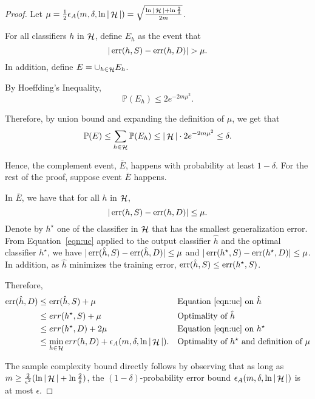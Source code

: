 \documentclass{article}
\DeclareMathOperator*{\err}{{\rm err}}
\DeclareMathOperator*{\Hcal}{{\cal H}}
\newcommand{\PP}{\mathbb{P}}
\begin{document}
\begin{proof}
Let $\mu = \frac{1}{2}\epsilon_A(m,\delta,\ln|\Hcal|) = \sqrt{\frac{\ln|\Hcal| + \ln\frac{2}{\delta}}{2m}}$.

For all classifiers $h$ in $\Hcal$, define $E_h$ as the event that
\[ |\err(h, S) - \err(h, D)| > \mu. \]
In addition, define $E = \cup_{h \in \Hcal} E_h$.

By Hoeffding's Inequality,
\[ \PP(E_h) \leq 2 e^{-2 m \mu^2}. \]

Therefore, by union bound and expanding the definition of $\mu$, we get that
\[ \PP(E) \leq \sum_{h \in \Hcal} \PP(E_h) \leq |\Hcal| \cdot 2 e^{-2 m \mu^2} \leq \delta. \]

Hence, the complement event, $\bar{E}$, happens with probability at least $1-\delta$. For the rest of the proof, suppose event $\bar{E}$ happens.

In $\bar{E}$, we have that for all $h$ in $\Hcal$,
\begin{equation}
  |\err(h, S) - \err(h, D)| \leq \mu.
  \label{eqn:uc}
\end{equation}
Denote by $h^\star$ one of the classifier in $\Hcal$ that has the smallest generalization error. From Equation~\ref{eqn:uc} applied to the output classifier $\hat{h}$ and the optimal classifier $h^\star$, we have
$|\err(\hat{h}, S) - \err(\hat{h}, D)| \leq \mu$ and $|\err(h^\star, S) - \err(h^\star, D)| \leq \mu$.
In addition, as $\hat{h}$ minimizes the training error, $\err(\hat{h}, S) \leq \err(h^\star, S)$.

Therefore,
\begin{align*}
  \err(\hat{h}, D)
  &\leq \err(\hat{h}, S) + \mu && \text{Equation~\eqref{eqn:uc} on $\hat{h}$} \\
  &\leq err(h^\star, S) + \mu && \text{Optimality of $\hat{h}$}\\
  &\leq err(h^\star, D) + 2 \mu && \text{Equation~\eqref{eqn:uc} on $h^\star$}\\
  &\leq \min_{h \in \Hcal} err(h, D) + \epsilon_A(m,\delta,\ln|\Hcal|). && \text{Optimality of $h^\star$ and definition of $\mu$}
\end{align*}

The sample complexity bound directly follows by observing that as long as $m \geq \frac{2}{\epsilon^2}(\ln|\Hcal| + \ln\frac{2}{\delta})$,
the $(1-\delta)$-probability error bound $\epsilon_A(m, \delta, \ln|\Hcal|)$ is at most $\epsilon$.
\end{proof}




\end{document}
